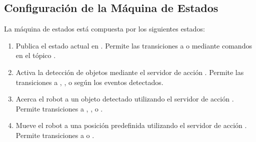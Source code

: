 \documentclass[a4paper,10pt,spanish]{sphinxmanual}
\begin{document}
\subsection{Configuración de la Máquina de Estados}
\label{\detokenize{uso:configuracion-de-la-maquina-de-estados}}
\sphinxAtStartPar
La máquina de estados está compuesta por los siguientes estados:
\begin{enumerate}
%
\item {} 
\sphinxAtStartPar
{}
\sphinxhyphen{} Publica el estado actual en .
\sphinxhyphen{} Permite las transiciones a  o  mediante comandos en el tópico .

\item {} 
\sphinxAtStartPar
{}
\sphinxhyphen{} Activa la detección de objetos mediante el servidor de acción .
\sphinxhyphen{} Permite las transiciones a , , o  según los eventos detectados.

\item {} 
\sphinxAtStartPar
{}
\sphinxhyphen{} Acerca el robot a un objeto detectado utilizando el servidor de acción .
\sphinxhyphen{} Permite transiciones a , , o .

\item {} 
\sphinxAtStartPar
{}
\sphinxhyphen{} Mueve el robot a una posición predefinida utilizando el servidor de acción .
\sphinxhyphen{} Permite transiciones a  o .

\end{enumerate}
\end{document}
